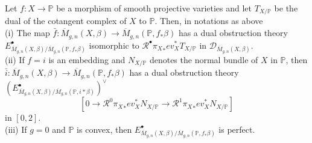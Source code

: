 \begin{proposition}\label{manolacheVirtualPullbacks2012-prop-5.3}
\label{manolacheVirtualPullbacks2012-cbg}
 Let $f:X\rightarrow \mathbb{P}$ be a morphism of smooth projective varieties and let $T_{X/\mathbb{P}}$ be the dual of the cotangent complex of $X$ to $\mathbb{P}$. Then, in notations as above
\\(i) The map $\bar{f}:\overline{M}_{g,n}(X,\beta)\to \overline{M}_{g,n}(\mathbb{P},f_*\beta)$ has a dual obstruction theory $E_{\overline{M}_{g,n}(X,\beta)/\overline{M}_{g,n}(\mathbb{P},f_*\beta)}^{\bullet}$ isomorphic to $\mathcal{R}^{\bullet}{\pi_X}_*ev_X^*T_{X/\mathbb{P}}$ in $\mathcal{D}_{\overline{M}_{g,n}(X,\beta)}$.
\\(ii) If $f=i$ is an embedding and $N_{X/\mathbb{P}}$ denotes the normal bundle of $X$ in $\mathbb{P}$, then $\bar{i}:\overline{M}_{g,n}(X,\beta)\to \overline{M}_{g,n}(\mathbb{P},f_*\beta)$ has a dual obstruction theory $(E_{\overline{M}_{g,n}(X,\beta)/\overline{M}_{g,n}(\mathbb{P},i*\beta)}^{\bullet})^{\vee}$ $$[0\to\mathcal{R}^0{\pi_X}_*ev_X^* N_{X/\mathbb{P}}\to \mathcal{R}^1{\pi_X}_*ev_X^* N_{X/\mathbb{P}}]$$ in $[0,2]$.
\\(iii) If $g=0$ and $\mathbb{P}$ is convex, then $E_{\overline{M}_{g,n}(X,\beta)/\overline{M}_{g,n}(\mathbb{P},f_*\beta)}^{\bullet}$ is perfect.
\end{proposition}

